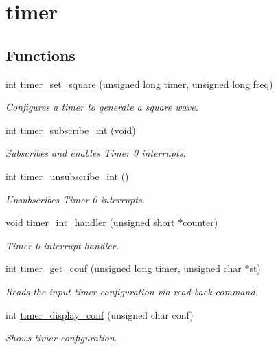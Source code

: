 \hypertarget{group__timer}{}\section{timer}
\label{group__timer}
\subsection*{Functions}
\begin{DoxyCompactItemize}
\item 
int \hyperlink{group__timer_gada4efbb5c88275795526fc45f0814aa3}{timer\+\_\+set\+\_\+square} (unsigned long timer, unsigned long freq)
\begin{DoxyCompactList}\small\item\em Configures a timer to generate a square wave. \end{DoxyCompactList}\item 
int \hyperlink{group__timer_ga4c5d9f47323eda494cfd826f6d62eec9}{timer\+\_\+subscribe\+\_\+int} (void)
\begin{DoxyCompactList}\small\item\em Subscribes and enables Timer 0 interrupts. \end{DoxyCompactList}\item 
int \hyperlink{group__timer_gab9eea51549744bca5c5c923b388bb4ee}{timer\+\_\+unsubscribe\+\_\+int} ()
\begin{DoxyCompactList}\small\item\em Unsubscribes Timer 0 interrupts. \end{DoxyCompactList}\item 
void \hyperlink{group__timer_gab1d93f51769dceca366a7613507e829d}{timer\+\_\+int\+\_\+handler} (unsigned short $\ast$counter)
\begin{DoxyCompactList}\small\item\em Timer 0 interrupt handler. \end{DoxyCompactList}\item 
int \hyperlink{group__timer_ga8eb3357bc05265afc4bea5bbbb480a53}{timer\+\_\+get\+\_\+conf} (unsigned long timer, unsigned char $\ast$st)
\begin{DoxyCompactList}\small\item\em Reads the input timer configuration via read-\/back command. \end{DoxyCompactList}\item 
int \hyperlink{group__timer_ga9ca64a3f3f048936d961d656d6829200}{timer\+\_\+display\+\_\+conf} (unsigned char conf)
\begin{DoxyCompactList}\small\item\em Shows timer configuration. \end{DoxyCompactList}\item 

\end{DoxyCompactItemize}

